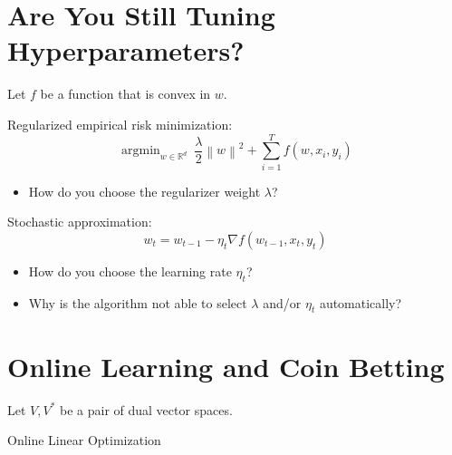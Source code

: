 \documentclass[30pt,landscape]{sciposter}
\DeclareMathOperator*{\argmin}{argmin}
\newcommand{\R}{\mathbb{R}}
\newcommand{\norm}[1]{\left\|#1\right\|}
\newcommand{\grad}{\nabla}
\begin{document}
\setlength{\parindent}{0em}
\setlength{\columnsep}{4cm}
\begin{multicols}{3}

\section*{Are You Still Tuning Hyperparameters?}

Let $f$ be a function that is convex in $w$.

Regularized empirical risk minimization:
$$
    \argmin_{w \in \R^d} \ \frac{\lambda}{2} \norm{w}^2 + \sum_{i=1}^T f(w, x_i, y_i)
$$
\begin{itemize}
\item How do you choose the regularizer weight $\lambda$?
\end{itemize}

\vspace{1cm}

Stochastic approximation:
$$
    w_t = w_{t-1} - \eta_t \grad f(w_{t-1}, x_t, y_t)
$$
\begin{itemize}
\item How do you choose the learning rate $\eta_t$?
\end{itemize}

\vspace{1cm}

\begin{itemize}
\item Why is the algorithm not able to select $\lambda$ and/or $\eta_t$ automatically?
\end{itemize}

\section*{Online Learning and Coin Betting}

Let $V,V^*$ be a pair of dual vector spaces.

\vspace{1cm}

\setlength{\fboxrule}{5pt}
\setlength{\fboxsep}{10pt}
\begin{center}
Online Linear Optimization
\vspace{0.3cm}

\colorbox[rgb]{0.80,0.55,0.98}{}
\end{center}


\end{multicols}
\end{document}
